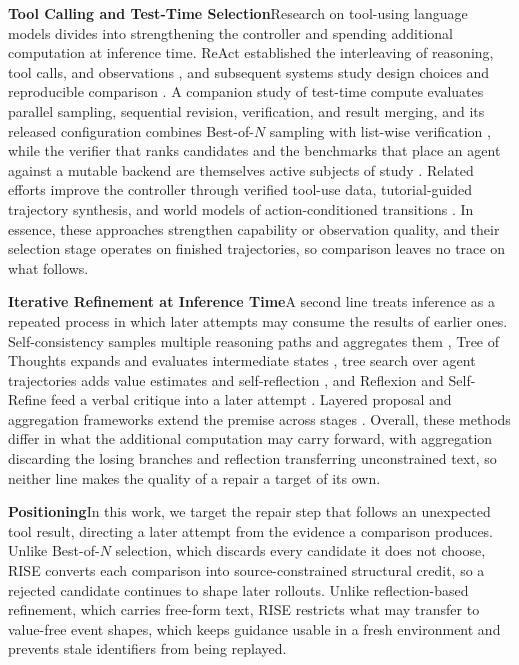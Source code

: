 \documentclass{article}
\newcommand{\method}{RISE\xspace}
\begin{document}
\textbf{Tool Calling and Test-Time Selection}\quad Research on tool-using language models divides into strengthening the controller and spending additional computation at inference time. ReAct established the interleaving of reasoning, tool calls, and observations \citep{yao2023react}, and subsequent systems study design choices and reproducible comparison \citep{oagents2025}. A companion study of test-time compute evaluates parallel sampling, sequential revision, verification, and result merging, and its released configuration combines \mbox{Best-of-$N$} sampling with list-wise verification \citep{oppo_tts2025}, while the verifier that ranks candidates and the benchmarks that place an agent against a mutable backend are themselves active subjects of study \citep{lightman2024verify,yao2024taubench}. Related efforts improve the controller through verified tool-use data, tutorial-guided trajectory synthesis, and world models of action-conditioned transitions \citep{mat2025,agenttrek2025,wma2025}. In essence, these approaches strengthen capability or observation quality, and their selection stage operates on finished trajectories, so comparison leaves no trace on what follows.

\textbf{Iterative Refinement at Inference Time}\quad A second line treats inference as a repeated process in which later attempts may consume the results of earlier ones. Self-consistency samples multiple reasoning paths and aggregates them \citep{wang2023selfconsistency}, Tree of Thoughts expands and evaluates intermediate states \citep{yao2023tree}, tree search over agent trajectories adds value estimates and self-reflection \citep{zhou2024lats}, and Reflexion and Self-Refine feed a verbal critique into a later attempt \citep{shinn2023reflexion,madaan2023selfrefine}. Layered proposal and aggregation frameworks extend the premise across stages \citep{moa2024}. Overall, these methods differ in what the additional computation may carry forward, with aggregation discarding the losing branches and reflection transferring unconstrained text, so neither line makes the quality of a repair a target of its own.

\textbf{Positioning}\quad In this work, we target the repair step that follows an unexpected tool result, directing a later attempt from the evidence a comparison produces. Unlike \mbox{Best-of-$N$} selection, which discards every candidate it does not choose, \method converts each comparison into source-constrained structural credit, so a rejected candidate continues to shape later rollouts. Unlike reflection-based refinement, which carries free-form text, \method restricts what may transfer to value-free event shapes, which keeps guidance usable in a fresh environment and prevents stale identifiers from being replayed.
\end{document}
